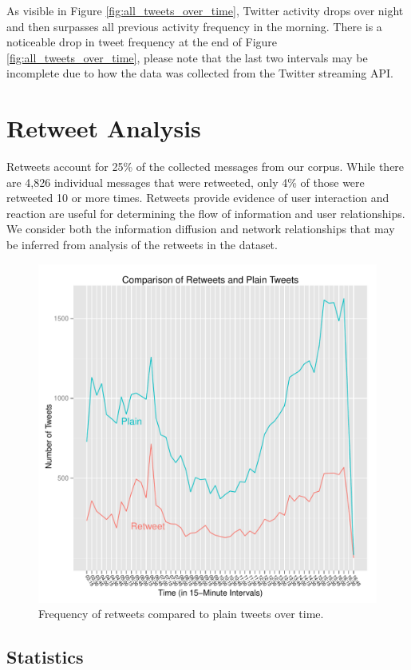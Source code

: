 \documentclass[a4paper, 11pt, titlepage]{article}
\begin{document}
As visible in Figure \ref{fig:all_tweets_over_time}, Twitter activity drops over night and then surpasses all previous activity frequency in the morning.  There is a noticeable drop in tweet frequency at the end of Figure \ref{fig:all_tweets_over_time}, please note that the last two intervals may be incomplete due to how the data was collected from the Twitter streaming API.

\section{Retweet Analysis}

Retweets account for 25\% of the collected messages from our corpus.  While there are 4,826 individual messages that were retweeted, only 4\% of those were retweeted 10 or more times.  Retweets provide evidence of user interaction and reaction are useful for determining the flow of information and user relationships.  We consider both the information diffusion and network relationships that may be inferred from analysis of the retweets in the dataset.

\begin{figure}[h!]
\centering
\includegraphics[width=120mm]{../figures/rt_compare_over_time}
\caption{Frequency of retweets compared to plain tweets over time.}
\label{fig:rt_compare_over_time}
\end{figure}

\subsection{Statistics}
\end{document}
